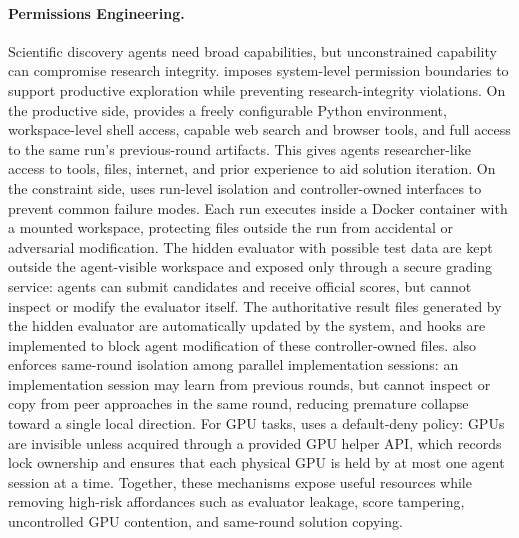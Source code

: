 \documentclass{article} %
\begin{document}
   \paragraph{Permissions Engineering.}
   Scientific discovery agents need broad capabilities, but unconstrained capability can compromise research integrity. 
   \method imposes system-level permission boundaries to support productive exploration while preventing research-integrity violations. 
   On the productive side, \method provides a freely configurable 
   Python environment, workspace-level shell access, capable web search and browser tools, and full access to the same run's previous-round artifacts.
   This gives agents researcher-like access to tools, files, internet, and prior experience to aid solution iteration. 
   On the constraint side, \method uses run-level isolation and controller-owned interfaces to prevent common failure modes. 
   Each run executes inside a Docker container with a mounted workspace, protecting files
   outside the run from accidental or adversarial modification. 
   The hidden evaluator with possible test data are kept outside the agent-visible workspace and exposed only through a secure grading service: agents can submit candidates and receive official scores, but cannot inspect or modify the
   evaluator itself. 
   The authoritative result files generated by the hidden evaluator
   are automatically updated by the system, and hooks are implemented to block agent modification of these controller-owned files. 
   \method also enforces same-round isolation among parallel implementation sessions: an implementation session may learn from previous rounds, but cannot inspect or copy from peer approaches in the same round, reducing premature collapse toward a single local direction. 
   For GPU tasks, \method uses a default-deny policy: GPUs are invisible unless acquired through a provided GPU helper API, which records lock ownership and ensures
   that each physical GPU is held by at most one agent session at a time.
   Together, these mechanisms expose useful resources while removing high-risk affordances such as evaluator leakage, score tampering, uncontrolled GPU contention, and same-round solution copying.
   
\end{document}
